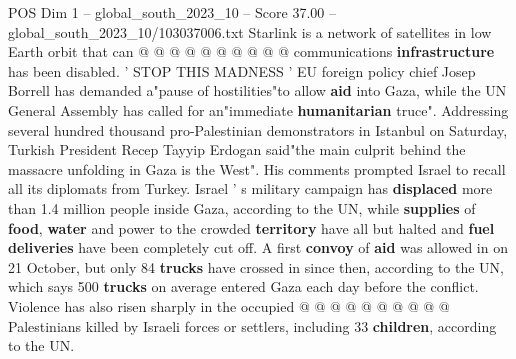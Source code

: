 \begin{textsample}{POS Dim 1 – global\_south\_2023\_10 – Score 37.00 – global\_south\_2023\_10/103037006.txt}
Starlink is a network of satellites in low Earth orbit that can @ @ @ @ @ @ @ @ @ @ communications \textbf{infrastructure} has been disabled. ' STOP THIS MADNESS ' EU foreign policy chief Josep Borrell has demanded a"pause of hostilities"to allow \textbf{aid} into Gaza, while the UN General Assembly has called for an"immediate \textbf{humanitarian} truce".
Addressing several hundred thousand pro-Palestinian demonstrators in Istanbul on Saturday, Turkish President Recep Tayyip Erdogan said"the main culprit behind the massacre unfolding in Gaza is the West".
His comments prompted Israel to recall all its diplomats from Turkey.
Israel ' s military campaign has \textbf{displaced} more than 1.4 million people inside Gaza, according to the UN, while \textbf{supplies} of \textbf{food}, \textbf{water} and power to the crowded \textbf{territory} have all but halted and \textbf{fuel} \textbf{deliveries} have been completely cut off.
A first \textbf{convoy} of \textbf{aid} was allowed in on 21 October, but only 84 \textbf{trucks} have crossed in since then, according to the UN, which says 500 \textbf{trucks} on average entered Gaza each day before the conflict.
Violence has also risen sharply in the occupied @ @ @ @ @ @ @ @ @ @ Palestinians killed by Israeli forces or settlers, including 33 \textbf{children}, according to the UN.

\end{textsample}
